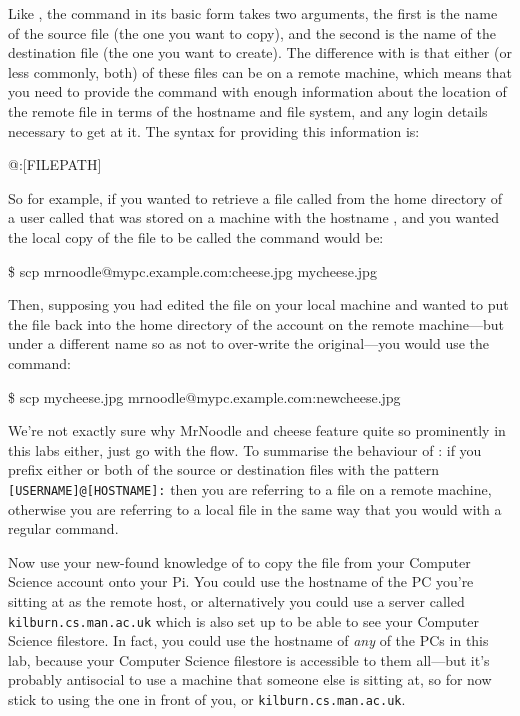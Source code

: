 Like , the  command in its basic form takes two arguments, the first is the name of the source file (the one you want to copy), and the second is the name of the destination file (the one you want to create). The difference with  is that either (or less commonly, both) of these files can be on a remote machine, which means that you need to provide the command with enough information about the location of the remote file in terms of the hostname and file system, and any login details necessary to get at it. The syntax for providing this information is:

\begin{ttoutenv}
[USERNAME]\!@\![HOSTNAME]:[FILEPATH]
\end{ttoutenv}

So for example, if you wanted to retrieve a file called  from the home directory of a user called  that was stored on a machine with the hostname , and you wanted the local copy of the file to be called  the command would be:

\begin{ttoutenv}
\$ scp mrnoodle@mypc.example.com:cheese.jpg mycheese.jpg
\end{ttoutenv}

Then, supposing you had edited the file  on your local machine and wanted to put the file back into the home directory of the  account on the remote machine---but under a different name so as not to over-write the original---you would use the command:

\begin{ttoutenv}
\$ scp mycheese.jpg mrnoodle@mypc.example.com:newcheese.jpg
\end{ttoutenv}

We're not exactly sure why MrNoodle and cheese feature quite so prominently in this labs either, just go with the flow. To summarise the behaviour of : if you prefix either or both of the source or destination files with the pattern \verb|[USERNAME]@[HOSTNAME]:| then you are referring to a file on a remote machine, otherwise you are referring to a local file in the same way that you would with a regular  command.

Now use your new-found knowledge of  to copy the  file from your Computer Science account onto your Pi. You could use the hostname of the PC you're sitting at as the remote host, or alternatively you could use a server called \texttt{kilburn.cs.man.ac.uk} which is also set up to be able to see your Computer Science filestore. In fact, you could use the hostname of \textit{any} of the PCs in this lab, because your Computer Science filestore is accessible to them all---but it's probably antisocial to use a machine that someone else is sitting at, so for now stick to using the one in front of you, or \texttt{kilburn.cs.man.ac.uk}. 



